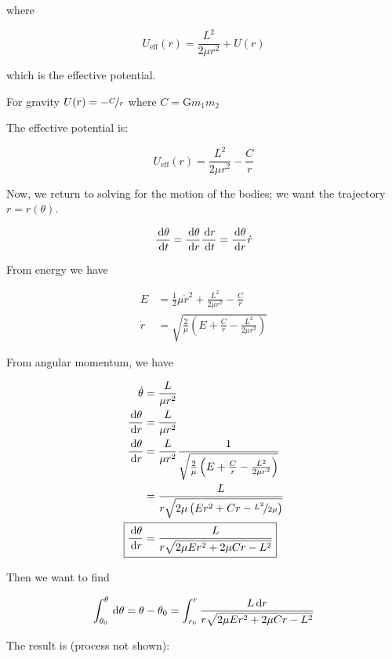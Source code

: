 where

\begin{equation}
	U_\mathrm{eff}(r) = \frac{L^2}{2 \mu r^2} + U(r)
\end{equation}

which is the effective potential.

For gravity $U(r) = - \nicefrac{C}{r}$ where $C = \mathrm{G} m_1 m_2$

The effective potential is:

\begin{equation}
	U_\mathrm{eff}(r) = \frac{L^2}{2 \mu r^2} - \frac{C}{r}
\end{equation}

Now, we return to solving for the motion of the bodies; we want the trajectory $r = r(\theta)$.

\begin{equation}
	\frac{\D \theta}{\D t} = \frac{\D \theta}{\D r} \frac{\D r}{\D t} = \frac{\D \theta}{\D r} \dot r
\end{equation}

From energy we have

\begin{align}
	E &= \frac{1}{2} \mu \dot r^2 + \frac{L^2}{2\mu r^2} - \frac{C}{r}\\
	\dot r &= \sqrt{\frac{2}{\mu} \left(E + \frac{C}{r} - \frac{L^2}{2\mu r^2}\right)}
\end{align}

From angular momentum, we have

\begin{align}
	\dot \theta &= \frac{L}{\mu r^2}\\
	\frac{\D \theta}{\D r} &= \frac{L}{\mu r^2}\\
	\frac{\D \theta}{\D r} &= \frac{L}{\mu r^2} \frac{1}{\sqrt{\frac{2}{\mu} \left(E + \frac{C}{r} - \frac{L^2}{2\mu r^2}\right)}}\\
	&= \frac{L}{r \sqrt{2 \mu \left(Er^2 + Cr - \nicefrac{L^2}{2\mu}\right)}}\\
	\Aboxed{\frac{\D \theta}{\D r} &= \frac{L}{r \sqrt{2 \mu E r^2 + 2 \mu Cr - L^2}}}
\end{align}

Then we want to find

\begin{equation}
	\int_{\theta_0}^\theta \D \theta = \theta - \theta_0 = \int_{r_0}^r \frac{L \D r}{r \sqrt{2 \mu E r^2 + 2 \mu Cr - L^2}}
\end{equation}

The result is (process not shown):

